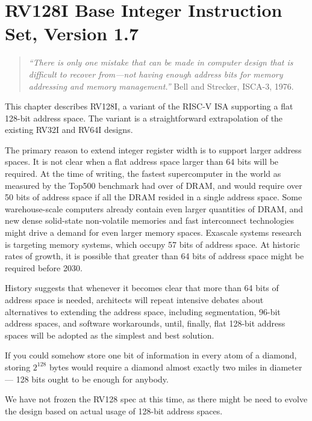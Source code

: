 \chapter{RV128I Base Integer Instruction Set, Version 1.7}
\label{rv128}

\begin{quote}
{\em ``There is only one mistake that can be made in computer design that is
difficult to recover from---not having enough address bits for memory
addressing and memory management.''} Bell and Strecker, ISCA-3, 1976.
\end{quote}

This chapter describes RV128I, a variant of the RISC-V ISA
supporting a flat 128-bit address space.  The variant is a
straightforward extrapolation of the existing RV32I and RV64I designs.

\begin{commentary}
The primary reason to extend integer register width is to support
larger address spaces.  It is not clear when a flat address space larger
than 64 bits will be required.  At the time of writing, the fastest
supercomputer in the world as measured by the Top500 benchmark had
over  of DRAM, and would require over 50 bits of address
space if all the DRAM resided in a single address space.  Some
warehouse-scale computers already contain even larger quantities of
DRAM, and new dense solid-state non-volatile memories and fast
interconnect technologies might drive a demand for even larger memory
spaces.  Exascale systems research is targeting 
memory systems, which occupy 57 bits of address space.  At historic
rates of growth, it is possible that greater than 64 bits of address
space might be required before 2030.

History suggests that whenever it becomes clear that more than 64 bits
of address space is needed, architects will repeat intensive debates
about alternatives to extending the address space, including
segmentation, 96-bit address spaces, and software workarounds, until,
finally, flat 128-bit address spaces will be adopted as the simplest
and best solution.

If you could somehow store one bit of information in every atom of a
diamond, storing $2^{128}$ bytes would require a diamond almost exactly
two miles in diameter --- 128 bits ought to be enough for anybody.

We have not frozen the RV128 spec at this time, as there might be need
to evolve the design based on actual usage of 128-bit address spaces.
\end{commentary}

